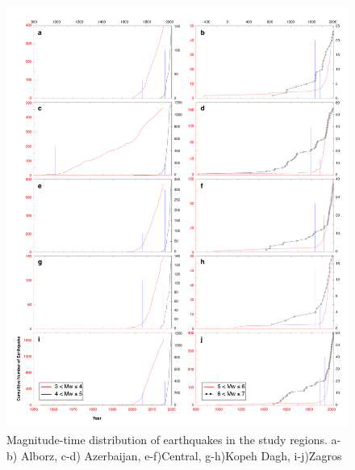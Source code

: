 \begin{figure} [!ht]
\centering
\includegraphics[scale=0.28]{figures/pdf/figure-07.pdf} 
\caption{Magnitude-time distribution of earthquakes in the study regions. a-b) Alborz, c-d) Azerbaijan, e-f)Central, g-h)Kopeh Dagh, i-j)Zagros}
\label{fig:comp_test_all_mag}
\end{figure}



